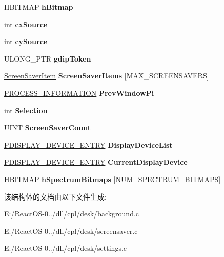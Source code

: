 \begin{DoxyCompactItemize}
H\+B\+I\+T\+M\+AP {\bfseries h\+Bitmap}
\item 
\mbox{\label{struct___d_a_t_a_a20f384f5343c5116dcbe580ebcc2488f}} 
int {\bfseries cx\+Source}
\item 
\mbox{\label{struct___d_a_t_a_a4089d69e7130e2cb91fa209f0b2babbc}} 
int {\bfseries cy\+Source}
\item 
\mbox{\label{struct___d_a_t_a_a999b37c2bdc70502fa7042f3b2da2771}} 
U\+L\+O\+N\+G\+\_\+\+P\+TR {\bfseries gdip\+Token}
\item 
\mbox{\label{struct___d_a_t_a_a7ea28efd7e9b02dca5c7ad1500e9ca54}} 
\hyperlink{struct_screen_saver_item}{Screen\+Saver\+Item} {\bfseries Screen\+Saver\+Items} \mbox{[}M\+A\+X\+\_\+\+S\+C\+R\+E\+E\+N\+S\+A\+V\+E\+RS\mbox{]}
\item 
\mbox{\label{struct___d_a_t_a_ab8426f2f3c3e69324ea20cc4b7aa578c}} 
\hyperlink{struct___p_r_o_c_e_s_s___i_n_f_o_r_m_a_t_i_o_n}{P\+R\+O\+C\+E\+S\+S\+\_\+\+I\+N\+F\+O\+R\+M\+A\+T\+I\+ON} {\bfseries Prev\+Window\+Pi}
\item 
\mbox{\label{struct___d_a_t_a_a5140fdd963072f2d39c38e330dbc3b92}} 
int {\bfseries Selection}
\item 
\mbox{\label{struct___d_a_t_a_accf4226da7051c77c900ee819d1cafa4}} 
U\+I\+NT {\bfseries Screen\+Saver\+Count}
\item 
\mbox{\label{struct___d_a_t_a_ae4feaeb4f5a1a02d56be6fbe1497ba98}} 
\hyperlink{struct___d_i_s_p_l_a_y___d_e_v_i_c_e___e_n_t_r_y}{P\+D\+I\+S\+P\+L\+A\+Y\+\_\+\+D\+E\+V\+I\+C\+E\+\_\+\+E\+N\+T\+RY} {\bfseries Display\+Device\+List}
\item 
\mbox{\label{struct___d_a_t_a_a45d78e3d875f9e9ddef853a4d933a996}} 
\hyperlink{struct___d_i_s_p_l_a_y___d_e_v_i_c_e___e_n_t_r_y}{P\+D\+I\+S\+P\+L\+A\+Y\+\_\+\+D\+E\+V\+I\+C\+E\+\_\+\+E\+N\+T\+RY} {\bfseries Current\+Display\+Device}
\item 
\mbox{\label{struct___d_a_t_a_a25d67895f68e3a0d6ab382262516030a}} 
H\+B\+I\+T\+M\+AP {\bfseries h\+Spectrum\+Bitmaps} \mbox{[}N\+U\+M\+\_\+\+S\+P\+E\+C\+T\+R\+U\+M\+\_\+\+B\+I\+T\+M\+A\+PS\mbox{]}
\end{DoxyCompactItemize}


该结构体的文档由以下文件生成\+:\begin{DoxyCompactItemize}
\item 
E\+:/\+React\+O\+S-\/0../dll/cpl/desk/background.\+c\item 
E\+:/\+React\+O\+S-\/0../dll/cpl/desk/screensaver.\+c\item 
E\+:/\+React\+O\+S-\/0../dll/cpl/desk/settings.\+c\end{DoxyCompactItemize}
